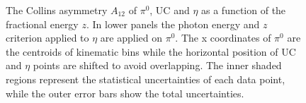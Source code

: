 \begin{figure}[H]
  \centering     
\caption{The Collins asymmetry $A_{12}$ of $\pi^0$, UC and $\eta$ as a function of the fractional energy $z$. In lower panels the photon energy and $z$ criterion applied to $\eta$ are applied on $\pi^0$. The x coordinates of $\pi^0$ are the centroids of kinematic bins while the horizontal position of UC and $\eta$ points are shifted to avoid overlapping. The inner shaded regions represent the statistical uncertainties of each data point, while the outer error bars show the total uncertainties.}
\label{fig:finalasymmetry2}
\end{figure}

